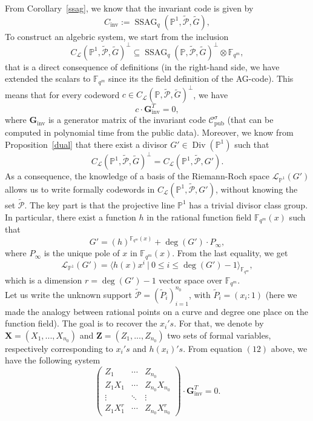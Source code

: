\documentclass[10pt]{article}
\theoremstyle{definition}
\theoremstyle{definition}
\theoremstyle{definition}
\newcommand{\cd}{\cdot}
\newcommand{\PP}{\mathbb{P}}
\newcommand{\fqm}{\mathbb{F}_{q^m}}
\newcommand{\su}{\subseteq}
\newcommand{\PR}{\mathcal{P}}
\newcommand{\Div}{\operatorname{Div}}
\newcommand{\ssag}{\operatorname{SSAG}}
\newcommand{\calL}{\mathcal{L}}
\begin{document}
From Corollary~\ref{ssag}, we know that the invariant code is given by 
\[C_{\mathrm{inv}} := \ssag_q\left(\PP^1,\tilde{\PR},\tilde{G}\right),\]
To construct an algebric system, we start from the inclusion 
\[C_{\calL}(\PP^1,\tilde{\PR},\tilde{G})^{\perp} \su \ssag_q(\PP,\tilde{\PR},\tilde{G})^{\perp} \otimes \fqm,\]
that is a direct consequence of definitions (in the right-hand side, we have extended the scalars to $\fqm$ since its the field definition of the AG-code). This means that for every codeword $c \in C_{\calL}(\PP,\tilde{\PR},\tilde{G})^{\perp}$, we have 
\begin{equation}
c \cd \mathbf{G}_{\mathrm{inv}}^T = 0,
\end{equation}
where $\mathbf{G}_{\mathrm{inv}}$ is a generator matrix of the invariant code $\mathcal{C}_{\mathrm{pub}}^{\sigma}$ (that can be computed in polynomial time from the public data). Moreover, we know from Proposition~\ref{dual} that there exist a divisor $G' \in \Div(\PP^1)$ such that
\[ C_{\calL}(\PP^1,\tilde{\PR},\tilde{G})^{\perp} = C_{\calL}(\PP^1,\tilde{\PR},G').\]
As a consequence, the knowledge of a basis of the Riemann-Roch space $\calL_{\mathbb{P}^1}(G')$ allows us to write formally codewords in $C_{\calL}(\PP^1,\tilde{\PR},G')$, without knowing the set $\tilde{\PR}$. The key part is that the projective line $\PP^1$ has a trivial divisor class group. In particular, there exist a function $h$ in the rational function field $\fqm(x)$ such that
\[ G' = (h)^{\fqm(x)} + \deg(G') \cd P_{\infty},\]
where $P_{\infty}$ is the unique pole of $x$ in $\fqm(x)$. From the last equality, we get
\[\calL_{\mathbb{P}^1}(G') = \langle h(x)x^i \ | \ 0 \leq i \leq \deg(G')-1\rangle_{\fqm},\]
which is a dimension $r=\deg(G')-1$ vector space over $\fqm$. \\
Let us write the unknown support $\tilde{\PR} = (\tilde{P}_i)_{i=1}^{n_0}$, with $\tilde{P}_i=(x_i:1)$ (here we made the analogy between rational points on a curve and degree one place on the function field). The goal is to recover the $x_i's$. For that, we denote by  
$\mathbf{X} = (X_1,...,X_{n_0})$ and $\mathbf{Z} = (Z_1,...,Z_{n_0})$ two sets of formal variables, respectively corresponding to $x_i's$ and $h(x_i)'s$. From equation $(12)$ above, we have the following system
\begin{equation*}
\begin{pmatrix}
Z_1 & \cdots & Z_{n_0} \\
Z_1X_1 & \cdots & Z_{n_0}X_{n_0} \\
\vdots & \ddots & \vdots \\
Z_1X_1^r & \cdots & Z_{n_0}X_{n_0}^r 
\end{pmatrix}
\cd \mathbf{G}_{\mathrm{inv}}^T= 0.
\end{equation*}
\end{document}
